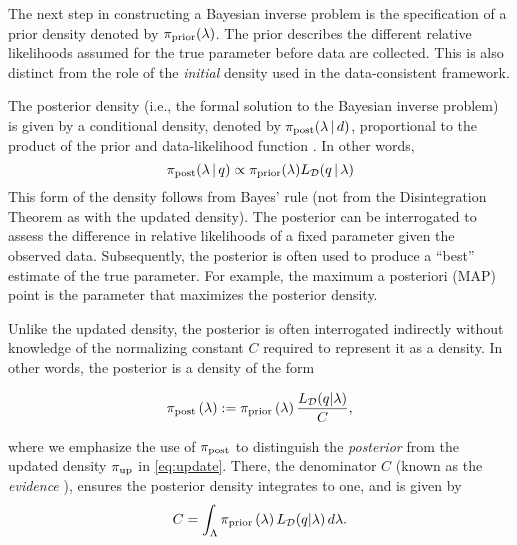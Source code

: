 The next step in constructing a Bayesian inverse problem is the specification of a prior density denoted by $\pi_\text{prior}(\lambda)$.
The prior describes the different relative likelihoods assumed for the true parameter before data are collected.
This is also distinct from the role of the {\em initial} density used in the data-consistent framework.

The posterior density (i.e., the formal solution to the Bayesian inverse problem) is given by a conditional density, denoted by $\pi_\text{post}(\lambda\, | \, d)$, proportional to the product of the prior and data-likelihood function \citep{Walpole, Berger, Complete, Smith}.
In other words,
\begin{equation*}
	\operatorname*{\pi_{post}}(\lambda\, | \, q) \propto \operatorname*{\pi_{prior}}(\lambda)L_{\mathcal{D}}(q\, | \, \lambda)
\end{equation*}
This form of the density follows from Bayes' rule (not from the Disintegration Theorem as with the updated density).
The posterior can be interrogated to assess the difference in relative likelihoods of a fixed parameter given the observed data.
Subsequently, the posterior is often used to produce a ``best'' estimate of the true parameter.
For example, the maximum a posteriori (MAP) point is the parameter that maximizes the posterior density.

Unlike the updated density, the posterior is often interrogated indirectly without knowledge of the normalizing constant $C$ required to represent it as a density.
In other words, the posterior is a density of the form

\begin{equation}\label{eq:sb_post}
    \operatorname*{\pi_{post}}\left ( \lambda \right ) := \operatorname*{\pi_{prior}}\left ( \lambda \right ) \frac{L_{\mathcal{D}} (q | \lambda)}{ C },
\end{equation}

\noindent where we emphasize the use of $\operatorname*{\pi_{post}}$ to distinguish the \emph{posterior} from the updated density $\operatorname*{\pi_{up}}$ in \eqref{eq:update}.
There, the denominator $C$ (known as the \emph{evidence} \cite{Smith}), ensures the posterior density integrates to one, and is given by
\[
C = \int_{\Lambda} \operatorname*{\pi_{prior}}\left ( \lambda \right ) L_{\mathcal{D}}(q | \lambda) \, d\lambda.
\]

